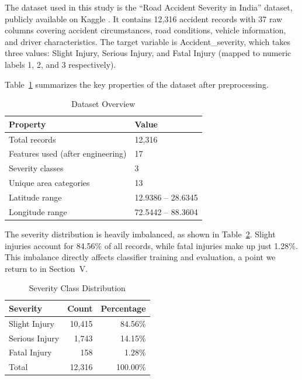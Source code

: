 \documentclass[conference]{IEEEtran}
\begin{document}
The dataset used in this study is the ``Road Accident Severity in India'' dataset, publicly available on Kaggle \cite{b19}. It contains 12,316 accident records with 37 raw columns covering accident circumstances, road conditions, vehicle information, and driver characteristics. The target variable is Accident\_severity, which takes three values: Slight Injury, Serious Injury, and Fatal Injury (mapped to numeric labels 1, 2, and 3 respectively).

Table~\ref{tab:dataset_overview} summarizes the key properties of the dataset after preprocessing.

\begin{table}[htbp]
\caption{Dataset Overview}
\begin{center}
\begin{tabular}{ll}
\toprule
\textbf{Property} & \textbf{Value} \\
\midrule
Total records & 12,316 \\
Features used (after engineering) & 17 \\
Severity classes & 3 \\
Unique area categories & 13 \\
Latitude range & 12.9386 -- 28.6345 \\
Longitude range & 72.5442 -- 88.3604 \\
\bottomrule
\end{tabular}
\label{tab:dataset_overview}
\end{center}
\end{table}

The severity distribution is heavily imbalanced, as shown in Table~\ref{tab:severity_dist}. Slight injuries account for 84.56\% of all records, while fatal injuries make up just 1.28\%. This imbalance directly affects classifier training and evaluation, a point we return to in Section~V.

\begin{table}[htbp]
\caption{Severity Class Distribution}
\begin{center}
\begin{tabular}{lrr}
\toprule
\textbf{Severity} & \textbf{Count} & \textbf{Percentage} \\
\midrule
Slight Injury & 10,415 & 84.56\% \\
Serious Injury & 1,743 & 14.15\% \\
Fatal Injury & 158 & 1.28\% \\
\midrule
Total & 12,316 & 100.00\% \\
\bottomrule
\end{tabular}
\label{tab:severity_dist}
\end{center}
\end{table}
\end{document}
